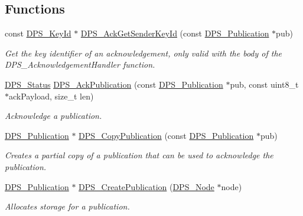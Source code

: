 \subsection*{Functions}
\begin{DoxyCompactItemize}
\item 
const \hyperlink{group__keystore_ga4345e29dd2ad5d7fd88a1e988787bd72}{D\+P\+S\+\_\+\+Key\+Id} $\ast$ \hyperlink{group__publication_ga9190b8fa3bad848fb428acd6c0c2b210}{D\+P\+S\+\_\+\+Ack\+Get\+Sender\+Key\+Id} (const \hyperlink{group__publication_ga0d439693474aa54e27f3d45a054696ac}{D\+P\+S\+\_\+\+Publication} $\ast$pub)
\begin{DoxyCompactList}\small\item\em Get the key identifier of an acknowledgement, only valid with the body of the D\+P\+S\+\_\+\+Acknowledgement\+Handler function. \end{DoxyCompactList}\item 
\hyperlink{group__status_ga30395a84d3cad9d4ec29848106415038}{D\+P\+S\+\_\+\+Status} \hyperlink{group__publication_ga308074429a566ffb8d04d55bae520b04}{D\+P\+S\+\_\+\+Ack\+Publication} (const \hyperlink{group__publication_ga0d439693474aa54e27f3d45a054696ac}{D\+P\+S\+\_\+\+Publication} $\ast$pub, const uint8\+\_\+t $\ast$ack\+Payload, size\+\_\+t len)
\begin{DoxyCompactList}\small\item\em Acknowledge a publication. \end{DoxyCompactList}\item 
\hyperlink{group__publication_ga0d439693474aa54e27f3d45a054696ac}{D\+P\+S\+\_\+\+Publication} $\ast$ \hyperlink{group__publication_ga41f31a8b63558e13d73d96de6086e5c4}{D\+P\+S\+\_\+\+Copy\+Publication} (const \hyperlink{group__publication_ga0d439693474aa54e27f3d45a054696ac}{D\+P\+S\+\_\+\+Publication} $\ast$pub)
\begin{DoxyCompactList}\small\item\em Creates a partial copy of a publication that can be used to acknowledge the publication. \end{DoxyCompactList}\item 
\hyperlink{group__publication_ga0d439693474aa54e27f3d45a054696ac}{D\+P\+S\+\_\+\+Publication} $\ast$ \hyperlink{group__publication_gaca070a96a6374e99a05d647c10737962}{D\+P\+S\+\_\+\+Create\+Publication} (\hyperlink{group__node_ga4dd612ab965134321bb57fdb065f121c}{D\+P\+S\+\_\+\+Node} $\ast$node)
\begin{DoxyCompactList}\small\item\em Allocates storage for a publication. \end{DoxyCompactList}\item 

\end{DoxyCompactItemize}

